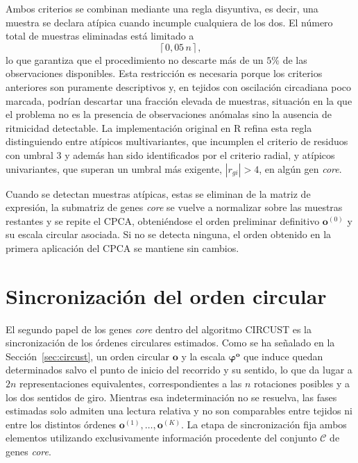 \documentclass[12pt, a4paper]{report}
\begin{document}
Ambos criterios se combinan mediante una regla disyuntiva, es decir, una muestra se declara atípica cuando incumple cualquiera de los dos. El número total de muestras eliminadas está limitado a
\[
\left\lceil 0{,}05\,n\right\rceil ,
\]
lo que garantiza que el procedimiento no descarte más de un \(5\%\) de las observaciones disponibles. Esta restricción es necesaria porque los criterios anteriores son puramente descriptivos y, en tejidos con oscilación circadiana poco marcada, podrían descartar una fracción elevada de muestras, situación en la que el problema no es la presencia de observaciones anómalas sino la ausencia de ritmicidad detectable. La implementación original en R refina esta regla distinguiendo entre atípicos multivariantes, que incumplen el criterio de residuos con umbral \(3\) y además han sido identificados por el criterio radial, y atípicos univariantes, que superan un umbral más exigente, \(\left|r_{gi}\right|>4\), en algún gen \textit{core}.

Cuando se detectan muestras atípicas, estas se eliminan de la matriz de expresión, la submatriz de genes \textit{core} se vuelve a normalizar sobre las muestras restantes y se repite el CPCA, obteniéndose el orden preliminar definitivo \(\mathbf{o}^{(0)}\) y su escala circular asociada. Si no se detecta ninguna, el orden obtenido en la primera aplicación del CPCA se mantiene sin cambios.

\section{Sincronización del orden circular}
\label{sec:Sincronizacion}

El segundo papel de los genes \textit{core} dentro del algoritmo CIRCUST es la sincronización de los órdenes circulares estimados. Como se ha señalado en la Sección~\ref{sec:circust}, un orden circular \(\mathbf{o}\) y la escala \(\boldsymbol{\varphi}^{\mathbf{o}}\) que induce quedan determinados salvo el punto de inicio del recorrido y su sentido, lo que da lugar a \(2n\) representaciones equivalentes, correspondientes a las \(n\) rotaciones posibles y a los dos sentidos de giro. Mientras esa indeterminación no se resuelva, las fases estimadas solo admiten una lectura relativa y no son comparables entre tejidos ni entre los distintos órdenes \(\mathbf{o}^{(1)},\ldots,\mathbf{o}^{(K)}\). La etapa de sincronización fija ambos elementos utilizando exclusivamente información procedente del conjunto \(\mathcal{C}\) de genes \textit{core}.
\end{document}
